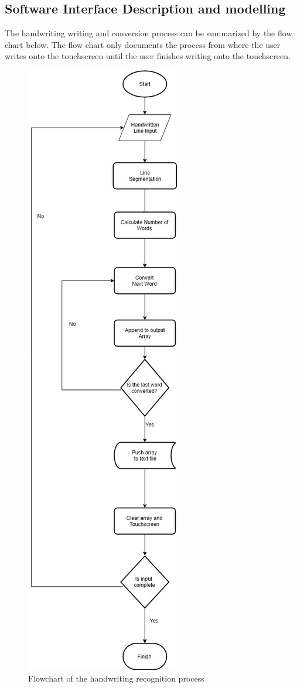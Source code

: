 \subsection{Software Interface Description and modelling}

The handwriting writing and conversion process can be summarized by the flow chart below. The flow chart only documents the process from where the user writes onto the touchscreen until the user finishes writing onto the touchscreen.
\clearpage
\begin{figure}[h]
	\centering
	\includegraphics[scale=0.5]{34}
	\caption{Flowchart of the handwriting recognition process}
\end{figure}
\clearpage

